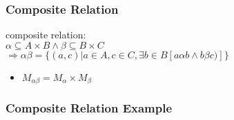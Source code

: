 \documentclass[dvipsnames]{beamer}
\begin{document}
\begin{frame}
  \frametitle{Composite Relation}

  \begin{definition}
    \alert{composite relation}:\\
      $\alpha \subseteq A \times B \wedge \beta \subseteq B \times C$\\
      $\Rightarrow \alpha \beta = \{(a,c) | a \in A, c \in C,
                \exists b \in B [a \alpha b \wedge b \beta c)]\}$
  \end{definition}

  \pause
  \begin{itemize}
    \item $M_{\alpha \beta} = M_{\alpha} \times M_{\beta}$
  \end{itemize}
\end{frame}

\begin{frame}
  \frametitle{Composite Relation Example}

  \begin{example}
    \begin{columns}
      \begin{center}
      \end{center}

      \begin{center}
      \end{center}
    \end{columns}
  \end{example}
\end{frame}
\end{document}
